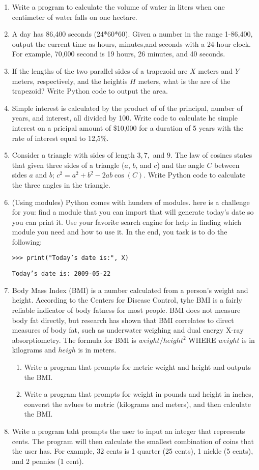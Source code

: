 \documentclass[14pt]{extarticle}
\begin{document}
\begin{enumerate}
	\item Write a program to calculate the volume of water in liters when one centimeter of water falls on one hectare.
	\item A day has 86,400 seconds (24*60*60). Given a number in the range 1-86,400, output the current time as hours, minutes,and seconds with a 24-hour clock. For example, 70,000 second is 19 hours, 26 minutes, and 40 seconds.
	\item If the lengths of the two parallel sides of a trapezoid are $X$ meters and $Y$ meters, respectively, and the heightis $H$ meters, what is the are of the trapezoid? Write Python code to output the area.
	\item Simple interest is calculated by the product of of the principal, number of years, and interest, all divided by 100. Write code to calculate he simple interest on a pricipal amount of \$10,000 for a duration of 5 years with the rate of interest equal to 12,5\%.
	\item Consider a triangle with sides of length $3,7,$ and $9$. The law of cosines states that given three sides of a triangle ($a$, $b$, and $c$) and the angle $C$ between sides $a$ and $b$; $c^2=a^2+b^2-2ab \cos (C)$. Write Python code to calculate the three angles in the triangle.
	\item (Using modules) Python comes with hunders of modules. here is a challenge for you: find a module that you can import that will generate today's date so you can print it. Use your favorite search engine for help in finding which module you need and how to use it. In the end, you task is to do the following:
	
	\texttt{>>> print("Today's date is:", X)}
	
	\texttt{Today's date is: 2009-05-22}
	
	\item Body Mass Index (BMI) is a number calculated from a person's weight and height. According to the Centers for Disease Control, tyhe BMI is a fairly reliable indicator of body fatness for most people. BMI does not measure body fat directly, but research has shown that BMI correlates to direct measures of body fat, such as underwater weighing and dual energy X-ray absorptiometry. The formula for BMI is $weight/height^2$ WHERE $weight$ is in kilograms and $heigh$ is in meters.
	\begin{enumerate}
		\item Write a program that prompts for metric weight and height and outputs the BMI.
		\item Write a program that prompts for weight in pounds and height in inches, converst the avlues to metric (kilograms and meters), and then calculate the BMI.
	\end{enumerate}
	\item Write a program taht prompts the user to input an integer that represents cents. The program will then calculate the smallest combination of coins that the user has. For example, 32 cents is 1 quarter (25 cents), 1 nickle (5 cents), and 2 pennies (1 cent).
\end{enumerate}
\end{document}
